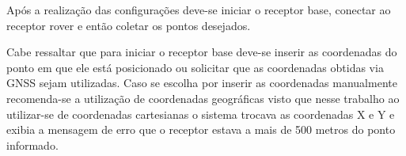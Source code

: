 Após a realização das configurações deve-se iniciar o receptor base, conectar ao receptor rover e então coletar os pontos desejados. 

Cabe ressaltar que para iniciar o receptor base deve-se inserir as coordenadas do ponto em que ele está posicionado ou solicitar que as coordenadas obtidas via GNSS sejam utilizadas. Caso se escolha por inserir as coordenadas manualmente recomenda-se a utilização de coordenadas geográficas visto que nesse trabalho ao utilizar-se de coordenadas cartesianas o sistema trocava as coordenadas X e Y e exibia a mensagem de erro que o receptor estava a mais de 500 metros do ponto informado.




